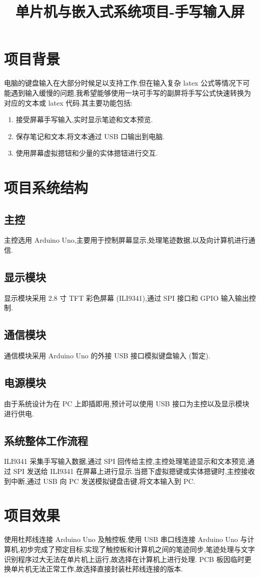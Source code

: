 
\usepackage{../../homeworks_preamble}
\title{单片机与嵌入式系统项目-手写输入屏}


    \maketitle
    \section{项目背景}
    电脑的键盘输入在大部分时候足以支持工作,但在输入复杂 latex 公式等情况下可能遇到输入缓慢的问题,我希望能够使用一块可手写的副屏将手写公式快速转换为对应的文本或 latex 代码.其主要功能包括:
    \begin{enumerate}
        \item 接受屏幕手写输入,实时显示笔迹和文本预览.
        \item 保存笔记和文本,将文本通过 USB 口输出到电脑.
        \item 使用屏幕虚拟摁钮和少量的实体摁钮进行交互.
    \end{enumerate}
    \section{项目系统结构}
        \subsection{主控}
            主控选用 Arduino Uno,主要用于控制屏幕显示,处理笔迹数据,以及向计算机进行通信.
        \subsection{显示模块}
            显示模块采用 2.8 寸 TFT 彩色屏幕 (ILI9341),通过 SPI 接口和 GPIO 输入输出控制.
        \subsection{通信模块}
            通信模块采用 Arduino Uno 的外接 USB 接口模拟键盘输入 (暂定).
        \subsection{电源模块}
            由于系统设计为在 PC 上即插即用,预计可以使用 USB 接口为主控以及显示模块进行供电.
        \subsection{系统整体工作流程}
            ILI9341 采集手写输入数据,通过 SPI 回传给主控,主控处理笔迹显示和文本预览,通过 SPI 发送给 ILI9341 在屏幕上进行显示.当摁下虚拟摁键或实体摁键时,主控接收到中断,通过 USB 向 PC 发送模拟键盘击键,将文本输入到 PC.
    \section{项目效果}
        使用杜邦线连接 Arduino Uno 及触控板,使用 USB 串口线连接 Arduino Uno 与计算机,初步完成了预定目标,实现了触控板和计算机之间的笔迹同步,笔迹处理与文字识别程序过大无法在单片机上运行,故选择在计算机上进行处理. PCB 板因临时更换单片机无法正常工作,故选择直接封装杜邦线连接的版本.

